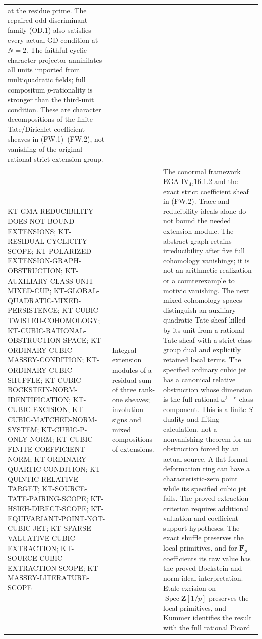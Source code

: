 \documentclass[11pt,a4paper]{article}
\theoremstyle{definition}
\begin{document}
\begin{longtable}{>{\raggedright\arraybackslash}p{}
>{\raggedright\arraybackslash}p{}
>{\raggedright\arraybackslash}p{}}
at the residue prime. The repaired odd-discriminant family
(OD.1) also satisfies every actual GD condition at $N=2$. The faithful cyclic-character projector
annihilates all units imported from multiquadratic fields; full
compositum $p$-rationality is stronger than the third-unit condition.
These are character decompositions of the finite Tate/Dirichlet
coefficient sheaves in (FW.1)--(FW.2), not vanishing of the
original rational strict extension group.\\
KT-GMA-REDUCIBILITY-DOES-NOT-BOUND-EXTENSIONS;
KT-RESIDUAL-CYCLICITY-SCOPE;
KT-POLARIZED-EXTENSION-GRAPH-OBSTRUCTION;
KT-AUXILIARY-CLASS-UNIT-MIXED-CUP;
KT-GLOBAL-QUADRATIC-MIXED-PERSISTENCE;
KT-CUBIC-TWISTED-COHOMOLOGY;
KT-CUBIC-RATIONAL-OBSTRUCTION-SPACE;
KT-ORDINARY-CUBIC-MASSEY-CONDITION;
KT-ORDINARY-CUBIC-SHUFFLE;
KT-CUBIC-BOCKSTEIN-NORM-IDENTIFICATION;
KT-CUBIC-EXCISION; KT-CUBIC-MATCHED-NORM-SYSTEM;
KT-CUBIC-P-ONLY-NORM;
KT-CUBIC-FINITE-COEFFICIENT-NORM;
KT-ORDINARY-QUARTIC-CONDITION; KT-QUINTIC-RELATIVE-TARGET;
KT-SOURCE-TATE-PAIRING-SCOPE;
KT-HSIEH-DIRECT-SCOPE;
KT-EQUIVARIANT-POINT-NOT-CUBIC-JET;
KT-SPARSE-VALUATIVE-CUBIC-EXTRACTION;
KT-SOURCE-CUBIC-EXTRACTION-SCOPE;
KT-MASSEY-LITERATURE-SCOPE &
Integral extension modules of a residual sum of three
rank-one sheaves; involution signs and mixed compositions
of extensions. &
The conormal framework EGA IV$_4$,16.1.2 and the exact
strict coefficient sheaf in (FW.2). Trace and reducibility
ideals alone do not bound the needed extension module.
The abstract graph retains irreducibility after five full
cohomology vanishings; it is not an arithmetic realization
or a counterexample to motivic vanishing. The next mixed
cohomology spaces distinguish an auxiliary quadratic Tate
sheaf killed by its unit from a rational Tate sheaf with
a strict class-group dual and explicitly retained local terms.
The specified ordinary cubic jet has a canonical relative
obstruction whose dimension is the full rational
$\omega^{1-e}$ class component. This is a finite-$S$
duality and lifting calculation, not a nonvanishing theorem
for an obstruction forced by an actual source. A flat formal
deformation ring can have a characteristic-zero point while
its specified cubic jet fails. The proved extraction criterion
requires additional valuation and coefficient-support hypotheses.
The exact shuffle preserves the local primitives, and for
$\mathbf F_p$ coefficients its raw value has the proved
Bockstein and norm-ideal interpretation. Etale excision on
$\operatorname{Spec}\mathbf Z[1/p]$ preserves the local primitives,
and Kummer identifies the result with the full rational Picard

\end{longtable}
\end{document}
